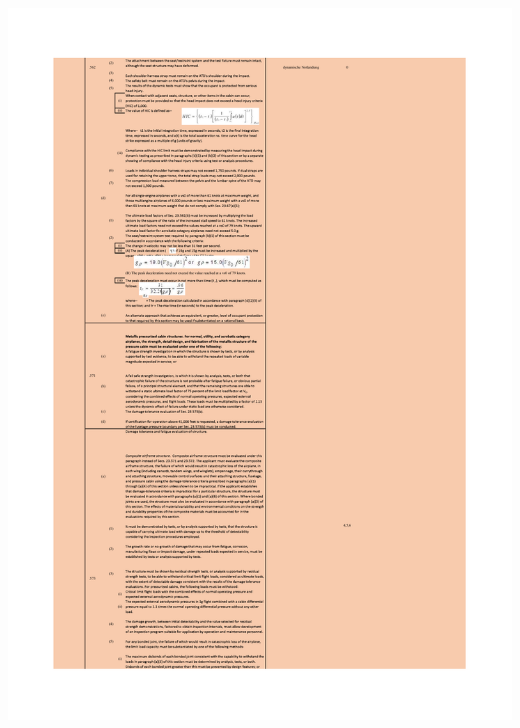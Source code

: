 \begin{table}[H]
\centering
\includegraphics[width=1.0\textwidth, trim={19mm 19mm 19mm 19mm}, clip]{bilder/Tabellen/MPP_Konstruktion_10.pdf}
\end{table}

